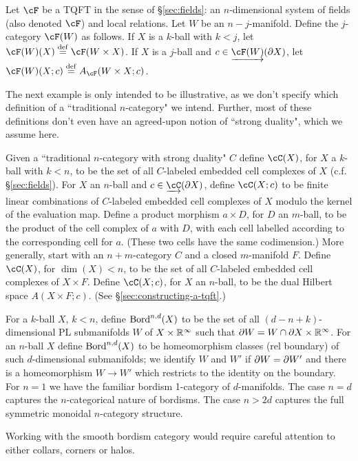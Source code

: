 \begin{example}
\rm
\label{ex:ncats-from-tqfts}%
Let $\cF$ be a TQFT in the sense of \S\ref{sec:fields}: an $n$-dimensional 
system of fields (also denoted $\cF$) and local relations.
Let $W$ be an $n{-}j$-manifold.
Define the $j$-category $\cF(W)$ as follows.
If $X$ is a $k$-ball with $k<j$, let $\cF(W)(X) \deq \cF(W\times X)$.
If $X$ is a $j$-ball and $c\in \cl{\cF(W)}(\bd X)$, 
let $\cF(W)(X; c) \deq A_\cF(W\times X; c)$.
\end{example}

The next example is only intended to be illustrative, as we don't specify 
which definition of a ``traditional $n$-category" we intend.
Further, most of these definitions don't even have an agreed-upon notion of 
``strong duality", which we assume here.
\begin{example}
\rm
\label{ex:traditional-n-categories}
Given a ``traditional $n$-category with strong duality" $C$
define $\cC(X)$, for $X$ a $k$-ball with $k < n$,
to be the set of all $C$-labeled embedded cell complexes of $X$ (c.f. \S \ref{sec:fields}).
For $X$ an $n$-ball and $c\in \cl{\cC}(\bd X)$, define $\cC(X; c)$ to be finite linear
combinations of $C$-labeled embedded cell complexes of $X$
modulo the kernel of the evaluation map.
Define a product morphism $a\times D$, for $D$ an $m$-ball, to be the product of the cell complex of $a$ with $D$,
with each cell labelled according to the corresponding cell for $a$.
(These two cells have the same codimension.)
More generally, start with an $n{+}m$-category $C$ and a closed $m$-manifold $F$.
Define $\cC(X)$, for $\dim(X) < n$,
to be the set of all $C$-labeled embedded cell complexes of $X\times F$.
Define $\cC(X; c)$, for $X$ an $n$-ball,
to be the dual Hilbert space $A(X\times F; c)$.
(See \S\ref{sec:constructing-a-tqft}.)
\end{example}


\begin{example}
\label{ex:bord-cat}
\rm
\label{ex:bordism-category}
For a $k$-ball $X$, $k<n$, define $\operatorname{Bord}^{n,d}(X)$ to be the set of all $(d{-}n{+}k)$-dimensional PL
submanifolds $W$ of $X\times \mathbb R^\infty$ such that $\partial W = W \cap \partial X \times \mathbb R^\infty$.
For an $n$-ball $X$ define $\operatorname{Bord}^{n,d}(X)$ to be homeomorphism classes (rel boundary) of such $d$-dimensional submanifolds;
we identify $W$ and $W'$ if $\partial W = \partial W'$ and there is a homeomorphism
$W \to W'$ which restricts to the identity on the boundary.
For $n=1$ we have the familiar bordism 1-category of $d$-manifolds.
The case $n=d$ captures the $n$-categorical nature of bordisms.
The case $n > 2d$ captures the full symmetric monoidal $n$-category structure.
\end{example}
\begin{remark}
Working with the smooth bordism category would require careful attention to either collars, corners or halos.
\end{remark}

